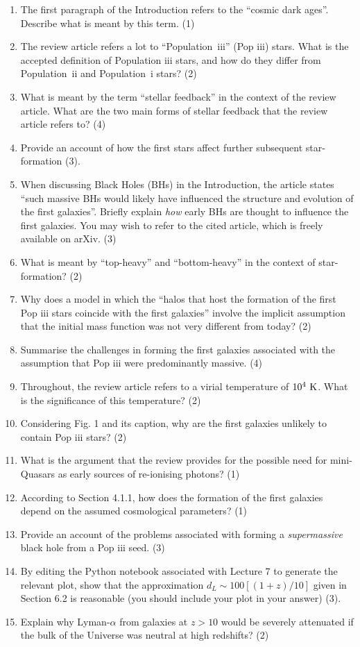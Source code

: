 \documentclass[11pt]{article}
\begin{document}
\begin{enumerate}
\item The first paragraph of the Introduction refers to the ``cosmic dark ages''. Describe what is meant by this term. (1)
\item The review article refers a lot to ``Population~{\sc iii}'' (Pop {\sc iii}) stars. What is the accepted definition of Population {\sc iii} stars, and how do they differ from Population~{\sc ii} and Population~{\sc i} stars? (2)
\item What is meant by the term ``stellar feedback'' in the context of the review article. What are the two main forms of stellar feedback that the review article refers to? (4)
\item Provide an account of how the first stars affect further subsequent star-formation (3).
\item When discussing Black Holes (BHs) in the Introduction, the article states ``such massive BHs would likely have influenced the structure and evolution of the first galaxies''. Briefly explain {\it how} early BHs are thought to influence the first galaxies. You may wish to refer to the cited article, which is freely available on arXiv. (3)
\item What is meant by ``top-heavy'' and ``bottom-heavy'' in the context of star-formation? (2)
\item Why does a model in which the ``halos that host the formation of the first Pop {\sc iii} stars coincide with the first galaxies'' involve the implicit assumption that the initial mass function was not very different from today? (2)
\item Summarise the challenges in forming the first galaxies associated with the assumption that Pop {\sc iii} were predominantly massive. (4)
\item Throughout, the review article refers to a virial temperature of $10^4~{\rm K}$. What is the significance of this temperature? (2)
\item Considering Fig. 1 and its caption, why are the first galaxies unlikely to contain Pop {\sc iii} stars? (2)
\item What is the argument that the review provides for the possible need for mini-Quasars as early sources of re-ionising photons? (1)
\item According to Section 4.1.1, how does the formation of the first galaxies depend on the assumed cosmological parameters? (1)
\item Provide an account of the problems associated with forming a {\it supermassive} black hole from a Pop {\sc iii} seed. (3)
\item By editing the Python notebook associated with Lecture 7 to generate the relevant plot, show that the approximation $d_L\sim100[(1+z)/10]$ given in Section 6.2 is reasonable (you should include your plot in your answer) (3).
\item Explain why Lyman-$\alpha$ from galaxies at $z>10$ would be severely attenuated if the bulk of the Universe was neutral at high redshifts? (2) 
\end{enumerate}
\end{document}
